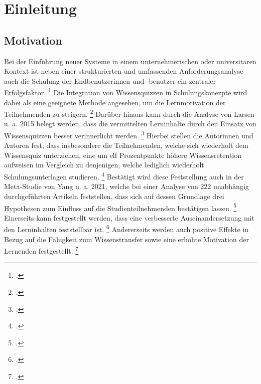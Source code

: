 \chapter{Einleitung}
\section{Motivation}\label{sec:motivation}
Bei der Einführung neuer Systeme in einem unternehmerischen oder universitären
Kontext ist neben einer strukturierten und umfassenden Anforderungsanalyse
auch
die Schulung der Endbenutzerinnen und -benutzer ein zentraler Erfolgsfaktor.
\footcite[Vgl.][S. 189 ff.]{leeEmpiricalStudyRelationships1995}
Die Integration von Wissensquizzen in Schulungskonezpte wird dabei
als eine geeignete Methode angesehen, um die Lernmotivation der Teilnehmenden zu steigern.
\footcites[Vgl.][83]{huangEmpoweringEndUsers1998}[1080]{maurerEQuizSimpleTool2007}[147]{paaERPEndUserTrainingELearning2014}
Darüber hinaus kann durch die Analyse von Larsen u. a. 2015 belegt werden, dass
die vermittelten Lerninhalte durch den Einsatz von Wissensquizzen besser verinnerlicht werden.
\footcite[Vgl.][S. 748 ff.]{larsenEffectsTestenhancedLearning2015}
Hierbei stellen die Autorinnen und Autoren fest, dass insbesondere die Teilnehmenden, welche
sich wiederholt dem Wissensquiz unterziehen, eine um elf Prozentpunkte höhere Wissensretention
aufweisen im Vergleich zu denjenigen, welche lediglich wiederholt Schulungsunterlagen studieren.
\footcite[Vgl.][748]{larsenEffectsTestenhancedLearning2015}
Bestätigt wird diese Feststellung auch in der Meta-Studie von Yang u. a. 2021, welche bei
einer Analyse von 222 unabhängig durchgeführten Artikeln feststellen, dass sich
auf dessen Grundlage drei Hypothesen zum Einfluss auf die Studienteilnehmenden bestätigen lassen.
\footcite[Vgl.][399]{yangTestingQuizzingBoosts2021}
Einerseits kann festgestellt werden, 
dass eine verbesserte Auseinandersetzung mit den Lerninhalten feststellbar ist.
\footcite[Vgl.][399]{yangTestingQuizzingBoosts2021}
Andererseits werden auch positive Effekte in Bezug auf die Fähigkeit zum Wissenstransfer
sowie eine erhöhte Motivation der Lernenden festgestellt.
\footcite[Vgl.][399]{yangTestingQuizzingBoosts2021}

